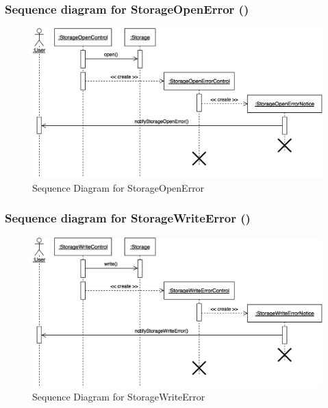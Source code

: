 \documentclass[12pt,letterpaper]{article}
\begin{document}
\subsubsection*{Sequence diagram for StorageOpenError (\storageopenerror{})}

\begin{figure}[H]
	\centering{}
	\includegraphics[scale=0.3]{imgs/seq/storage-open-error.png}
	\caption{Sequence Diagram for StorageOpenError}
\end{figure}

\subsubsection*{Sequence diagram for StorageWriteError (\storagewriteerror{})}

\begin{figure}[H]
	\centering{}
	\includegraphics[scale=0.3]{imgs/seq/storage-write-error.png}
	\caption{Sequence Diagram for StorageWriteError}
\end{figure}
\end{document}
